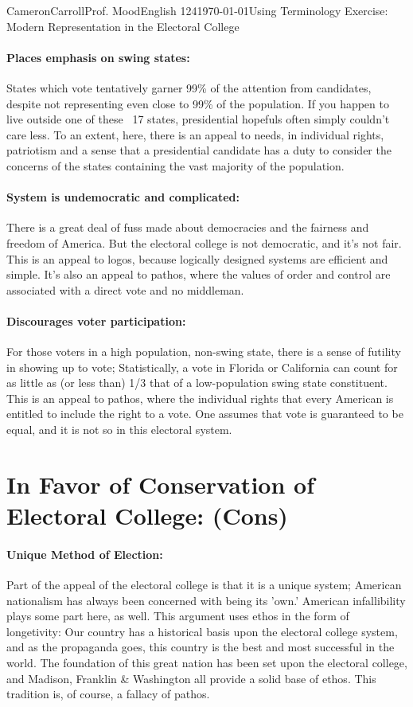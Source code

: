 \documentclass[12pt,letterpaper]{article}
\begin{document}
\begin{mla}{Cameron}{Carroll}{Prof. Mood}{English 124}{\today}{Using Terminology Exercise: Modern Representation in the Electoral College}
\paragraph{Places emphasis on swing states:}
States which vote tentatively garner 99\% of the attention from candidates, despite not representing even close to 99\% of the population. If you happen to live outside one of these ~17 states, presidential hopefuls often simply couldn't care less.
To an extent, here, there is an appeal to needs, in individual rights, patriotism and a sense that a presidential candidate has a duty to consider the concerns of the states containing the vast majority of the population.

\paragraph{System is undemocratic and complicated:}
There is a great deal of fuss made about democracies and the fairness and freedom of America. But the electoral college is not democratic, and it's not fair. This is an appeal to logos, because logically designed systems are efficient and simple. It's also an appeal to pathos, where the values of order and control are associated with a direct vote and no middleman.

\paragraph{Discourages voter participation:}
For those voters in a high population, non-swing state, there is a sense of futility in showing up to vote; Statistically, a vote in Florida or California can count for as little as (or less than) 1/3 that of a low-population swing state constituent. This is an appeal to pathos, where the individual rights that every American is entitled to include the right to a vote. One assumes that vote is guaranteed to be equal, and it is not so in this electoral system. 


\section*{In Favor of Conservation of Electoral College: (Cons)}

\paragraph{Unique Method of Election:}
Part of the appeal of the electoral college is that it is a unique system; American nationalism has always been concerned with being its 'own.' American infallibility plays some part here, as well. This argument uses ethos in the form of longetivity: Our country has a historical basis upon the electoral college system, and as the propaganda goes, this country is the best and most successful in the world. The foundation of this great nation has been set upon the electoral college, and Madison, Franklin \& Washington all provide a solid base of ethos. This tradition is, of course, a fallacy of pathos.


\end{mla}
\end{document}
